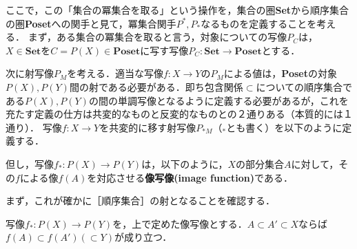 \documentclass[uplatex, 12pt, dvipdfmx]{jsreport}
\begin{document}
ここで，この「集合の冪集合を取る」という操作を，集合の圏\textbf{Set}から順序集合の圏\textbf{Poset}への関手と見て，冪集合関手$P^*,P_*$なるものを定義することを考える．
まず，ある集合の冪集合を取ると言う，対象についての写像$P_C$は，$X\in\mathbf{Set}$を$C=P(X)\in\mathbf{Poset}$に写す写像$P_C:\mathbf{Set}\to\mathbf{Poset}$とする．
\begin{center}\end{center}
次に射写像$P_M$を考える．適当な写像$f:X\to Y$の$P_M$による値は，\textbf{Poset}の対象$P(X),P(Y)$間の射である必要がある．即ち包含関係$\subset$についての順序集合である$P(X),P(Y)$の間の単調写像となるように定義する必要があるが，これを充たす定義の仕方は共変的なものと反変的なものとの２通りある（本質的には１通り）．
写像$f:X\to Y$を共変的に移す射写像$P_{*M}$（${}_*$とも書く）を以下のように定義する．
\begin{center}\end{center}
但し，写像$f_*:P(X)\to P(Y)$は，以下のように，$X$の部分集合$A$に対して，その$f$による像$f(A)$を対応させる\textbf{像写像(image function)}である．
\begin{center}\end{center}
まず，これが確かに［順序集合］の射となることを確認する．
\begin{proposition}
    写像$f_*:P(X)\to P(Y)$を，上で定めた像写像とする．$A\subset A'\subset X$ならば$f(A)\subset f(A') (\subset Y)$が成り立つ．
\end{proposition}
\end{document}
